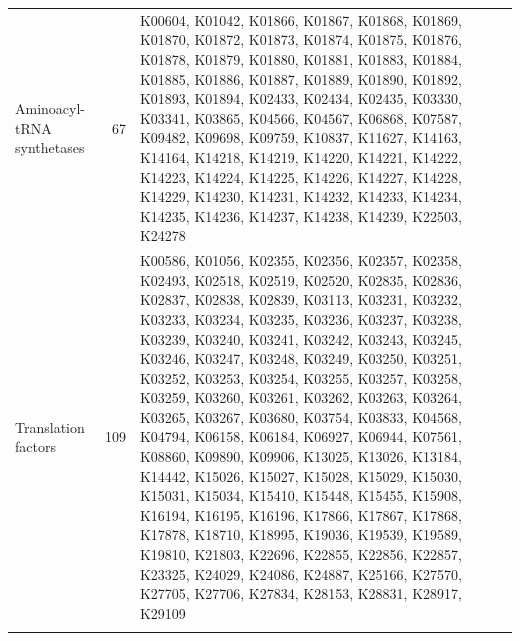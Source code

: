 \begin{longtable}{@{}p{3.2cm} r p{9.5cm}@{}}
\addlinespace
Aminoacyl-tRNA synthetases & 67 & K00604, K01042, K01866, K01867, K01868, K01869, K01870, K01872, K01873, K01874, K01875, K01876, K01878, K01879, K01880, K01881, K01883, K01884, K01885, K01886, K01887, K01889, K01890, K01892, K01893, K01894, K02433, K02434, K02435, K03330, K03341, K03865, K04566, K04567, K06868, K07587, K09482, K09698, K09759, K10837, K11627, K14163, K14164, K14218, K14219, K14220, K14221, K14222, K14223, K14224, K14225, K14226, K14227, K14228, K14229, K14230, K14231, K14232, K14233, K14234, K14235, K14236, K14237, K14238, K14239, K22503, K24278 \\
\addlinespace
Translation factors & 109 & K00586, K01056, K02355, K02356, K02357, K02358, K02493, K02518, K02519, K02520, K02835, K02836, K02837, K02838, K02839, K03113, K03231, K03232, K03233, K03234, K03235, K03236, K03237, K03238, K03239, K03240, K03241, K03242, K03243, K03245, K03246, K03247, K03248, K03249, K03250, K03251, K03252, K03253, K03254, K03255, K03257, K03258, K03259, K03260, K03261, K03262, K03263, K03264, K03265, K03267, K03680, K03754, K03833, K04568, K04794, K06158, K06184, K06927, K06944, K07561, K08860, K09890, K09906, K13025, K13026, K13184, K14442, K15026, K15027, K15028, K15029, K15030, K15031, K15034, K15410, K15448, K15455, K15908, K16194, K16195, K16196, K17866, K17867, K17868, K17878, K18710, K18995, K19036, K19539, K19589, K19810, K21803, K22696, K22855, K22856, K22857, K23325, K24029, K24086, K24887, K25166, K27570, K27705, K27706, K27834, K28153, K28831, K28917, K29109 \\
\addlinespace

\end{longtable}
